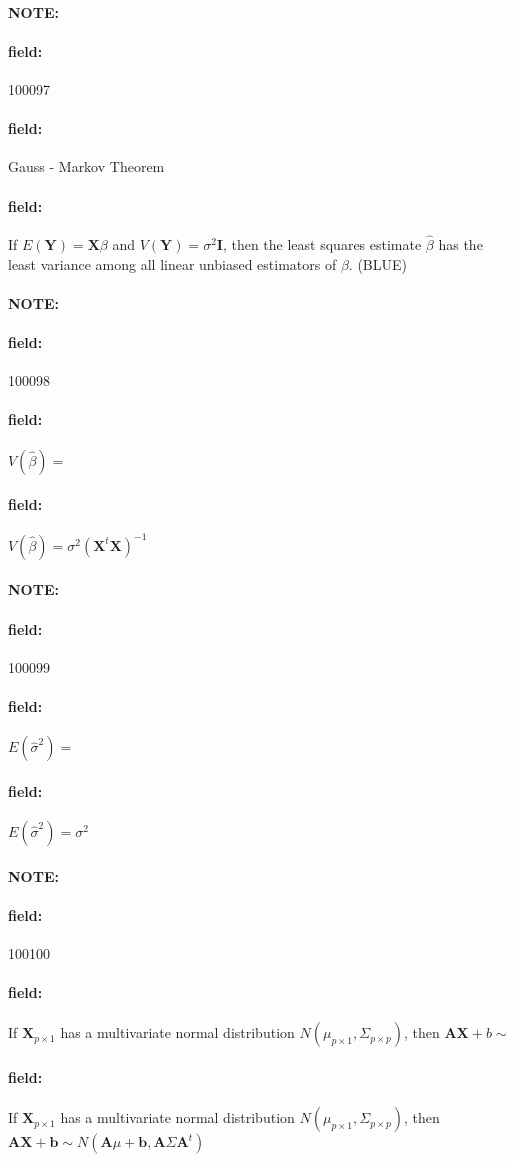 \documentclass[12pt]{article}
\newenvironment{note}{\paragraph{NOTE:}}{}
\newenvironment{field}{\paragraph{field:}}{}
\begin{document}
\begin{note} \begin{field} \tiny 100097 \end{field}
  \begin{field}
    Gauss - Markov Theorem
  \end{field}
  \begin{field}
    If $E(\mathbf{Y}) = \mathbf{X}\beta$ and $V(\mathbf{Y}) = \sigma^2 \mathbf{I}$, then the least squares estimate $\hat{\beta}$ has the least variance among all linear unbiased estimators of $\beta$. (BLUE)
  \end{field}
\end{note}



\begin{note} \begin{field} \tiny 100098 \end{field}
  \begin{field}
    $V(\hat{\beta}) = $
  \end{field}
  \begin{field}
    $V(\hat{\beta}) = \sigma^2 (\mathbf{X}^t \mathbf{X})^{-1}$
  \end{field}
\end{note}

\begin{note} \begin{field} \tiny 100099 \end{field}
  \begin{field}
    $E(\hat{\sigma}^2) = $
  \end{field}
  \begin{field}
    $E(\hat{\sigma}^2) = \sigma^2$
  \end{field}
\end{note}

\begin{note} \begin{field} \tiny 100100 \end{field}
  \begin{field}
    If $\mathbf{X}_{p \times 1}$ has a multivariate normal distribution $N(\mu_{p\times 1}, \Sigma_{p \times p})$, then $\mathbf{AX} + b \sim $
  \end{field}
  \begin{field}
    If $\mathbf{X}_{p \times 1}$ has a multivariate normal distribution $N(\mu_{p\times 1}, \Sigma_{p \times p})$, then $\mathbf{AX} + \mathbf{b} \sim N(\mathbf{A}\mu + \mathbf{b}, \mathbf{A}\Sigma \mathbf{A}^t)$



  \end{field}
\end{note}
\end{document}
